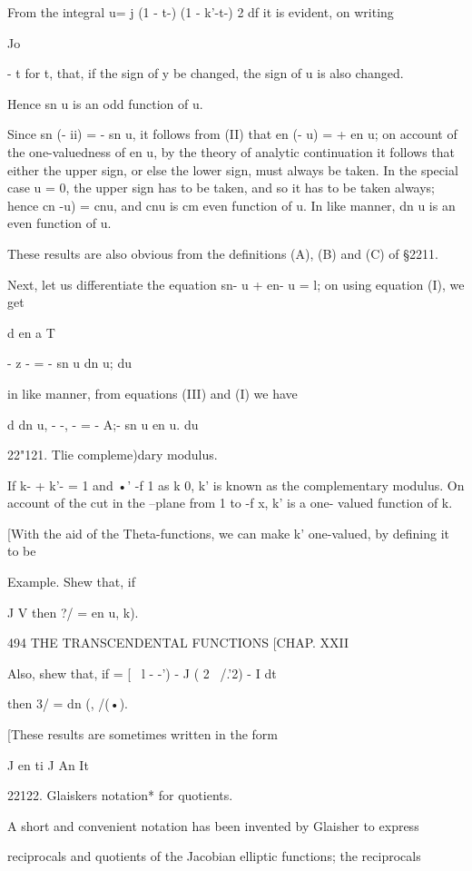 
From the integral u= j (1 - t-) (1 - k'-t-) 2 df it is evident, on
writing

Jo

- t for t, that, if the sign of y be changed, the sign of u is also
changed.

Hence sn u is an odd function of u.

Since sn (- ii) = - sn u, it follows from (II) that en (- u) = + en u;
on account of the one-valuedness of en u, by the theory of analytic
continuation it follows that either the upper sign, or else the lower
sign, must always be taken. In the special case u = 0, the upper sign
has to be taken, and so it has to be taken always; hence cn -u) = cnu,
and cnu is cm even function of u. In like manner, dn u is an even
function of u.

These results are also obvious from the definitions (A), (B) and (C)
of §2211.

Next, let us differentiate the equation sn- u + en- u = l; on using
equation (I), we get

d en a T

- z - = - sn u dn u; du

in like manner, from equations (III) and (I) we have

d dn u, - -, - = - A;- sn u en u. du

22"121. Tlie compleme)dary modulus.

If k- + k'- = 1 and •' -f 1 as k 0, k' is known as the complementary
modulus. On account of the cut in the --plane from 1 to -f x, k' is a
one- valued function of k.

[With the aid of the Theta-functions, we can make k' one-valued, by
defining it to be

Example. Shew that, if

J V then ?/ = en u, k).

494 THE TRANSCENDENTAL FUNCTIONS [CHAP. XXII

Also, shew that, if = [ \ l - -') - J ( 2 \ /.'2) - I dt

then 3/ = dn (, /(•).

[These results are sometimes written in the form

J en ti J An It

22122. Glaiskers notation* for quotients.

A short and convenient notation has been invented by Glaisher to
express

reciprocals and quotients of the Jacobian elliptic functions; the
reciprocals

